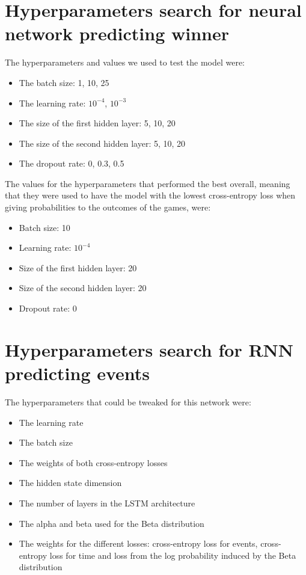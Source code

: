 \documentclass[10pt,conference,onecolumn]{IEEEtran}
\begin{document}



\begin{appendices}
\section{Hyperparameters search for neural network predicting winner} \label{appendix:hyperparams_simple_nn}
The hyperparameters and values we used to test the model were:
\begin{itemize}
  \item The batch size: 1, 10, 25
  \item The learning rate: $10^{-4}$, $10^{-3}$
  \item The size of the first hidden layer: 5, 10, 20
  \item The size of the second hidden layer: 5, 10, 20
  \item The dropout rate: 0, 0.3, 0.5
\end{itemize}

The values for the hyperparameters that performed the best overall, meaning that they were used to have the model with the lowest cross-entropy loss when giving probabilities to the outcomes of the games, were:
\begin{itemize}
  \item Batch size: 10
  \item Learning rate: $10^{-4}$
  \item Size of the first hidden layer: 20
  \item Size of the second hidden layer: 20
  \item Dropout rate: 0
\end{itemize}

\section{Hyperparameters search for RNN predicting events} \label{appendix:hyperparams_rnn}
The hyperparameters that could be tweaked for this network were:
\begin{itemize}
  \item The learning rate
  \item The batch size
  \item The weights of both cross-entropy losses
  \item The hidden state dimension
  \item The number of layers in the LSTM architecture
  \item The alpha and beta used for the Beta distribution
  \item The weights for the different losses: cross-entropy loss for events, cross-entropy loss for time and loss from the log probability induced by the Beta distribution
\end{itemize}


\end{appendices}
\end{document}
